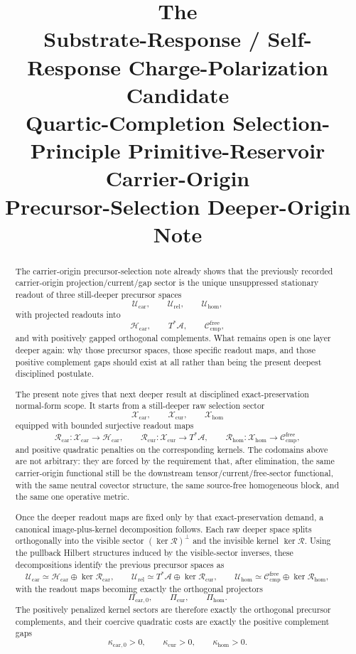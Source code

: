 \documentclass[11pt]{article}
\title{\textbf{The \TheoryName{}}\\[0.4em]
\large Substrate-Response / Self-Response Charge-Polarization Candidate\\
\large Quartic-Completion Selection-Principle Primitive-Reservoir Carrier-Origin\\
\large Precursor-Selection Deeper-Origin Note}
\author{}
\date{}
\newcommand{\Sub}{\mathcal A}
\newcommand{\CompFree}{\mathscr C_{\mathrm{cmp}}^{\mathrm{free}}}
\newcommand{\CarrierClass}{\mathscr H_{\mathrm{car}}}
\newcommand{\PreTensorClass}{\mathscr U_{\mathrm{car}}}
\newcommand{\PreRelabelClass}{\mathscr U_{\mathrm{rel}}}
\newcommand{\PreFreeClass}{\mathscr U_{\mathrm{hom}}}
\newcommand{\PreCarProj}{\Pi_{\mathrm{car},0}}
\newcommand{\CurrentProj}{\Pi_{\mathrm{cur}}}
\newcommand{\FreeReadProj}{\Pi_{\mathrm{hom}}}
\newcommand{\PreCarGap}{\kappa_{\mathrm{car},0}}
\newcommand{\CurrentGap}{\kappa_{\mathrm{cur}}}
\newcommand{\HomGap}{\kappa_{\mathrm{hom}}}
\newcommand{\DeepTensorClass}{\mathscr X_{\mathrm{car}}}
\newcommand{\DeepRelabelClass}{\mathscr X_{\mathrm{cur}}}
\newcommand{\DeepFreeClass}{\mathscr X_{\mathrm{hom}}}
\newcommand{\CarRead}{\mathcal R_{\mathrm{car}}}
\newcommand{\CurRead}{\mathcal R_{\mathrm{cur}}}
\newcommand{\HomRead}{\mathcal R_{\mathrm{hom}}}
\begin{document}
\maketitle

\begin{abstract}
The carrier-origin precursor-selection note already shows that the previously recorded carrier-origin projection/current/gap sector is the unique unsuppressed stationary readout of three still-deeper precursor spaces
\[
\PreTensorClass,\qquad
\PreRelabelClass,\qquad
\PreFreeClass,
\]
with projected readouts into
\[
\CarrierClass,\qquad
T^*\Sub,\qquad
\CompFree,
\]
and with positively gapped orthogonal complements. What remains open is one layer deeper again: why those precursor spaces, those specific readout maps, and those positive complement gaps should exist at all rather than being the present deepest disciplined postulate.

The present note gives that next deeper result at disciplined exact-preservation normal-form scope. It starts from a still-deeper raw selection sector
\[
\DeepTensorClass,\qquad
\DeepRelabelClass,\qquad
\DeepFreeClass
\]
equipped with bounded surjective readout maps
\[
\CarRead:\DeepTensorClass\to\CarrierClass,
\qquad
\CurRead:\DeepRelabelClass\to T^*\Sub,
\qquad
\HomRead:\DeepFreeClass\to\CompFree,
\]
and positive quadratic penalties on the corresponding kernels. The codomains above are not arbitrary: they are forced by the requirement that, after elimination, the same carrier-origin functional still be the downstream tensor/current/free-sector functional, with the same neutral covector structure, the same source-free homogeneous block, and the same one operative metric.

Once the deeper readout maps are fixed only by that exact-preservation demand, a canonical image-plus-kernel decomposition follows. Each raw deeper space splits orthogonally into the visible sector \((\ker \mathcal R)^\perp\) and the invisible kernel \(\ker \mathcal R\). Using the pullback Hilbert structures induced by the visible-sector inverses, these decompositions identify the previous precursor spaces as
\[
\PreTensorClass\simeq \CarrierClass\oplus \ker\CarRead,\qquad
\PreRelabelClass\simeq T^*\Sub\oplus \ker\CurRead,\qquad
\PreFreeClass\simeq \CompFree\oplus \ker\HomRead,
\]
with the readout maps becoming exactly the orthogonal projectors
\[
\PreCarProj,\qquad
\CurrentProj,\qquad
\FreeReadProj.
\]
The positively penalized kernel sectors are therefore exactly the orthogonal precursor complements, and their coercive quadratic costs are exactly the positive complement gaps
\[
\PreCarGap>0,\qquad
\CurrentGap>0,\qquad
\HomGap>0.
\]


\end{abstract}
\end{document}
